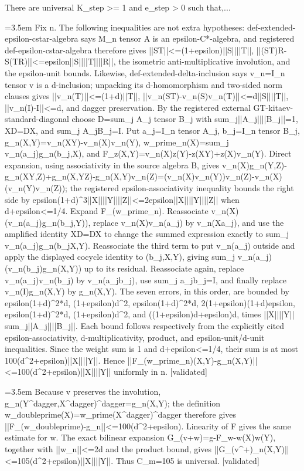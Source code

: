 \documentclass{article}
\newcommand{\step}[1]{\par\noindent\hangindent=3.5em\hangafter=1%
  \makebox[3.5em][l]{\textbf{#1.}}}
\newcommand{\steptag}[1]{\hfill{\small\textsf{[#1]}}}
\begin{document}
\begin{proofbox}{There are universal K\_step >= 1 and e\_step > 0 such that,...}
\step{1.3.1} Fix n. The following inequalities are not extra hypotheses: def-extended-epsilon-cstar-algebra says M\_n tensor A is an epsilon-C*-algebra, and registered def-epsilon-cstar-algebra therefore gives ||ST||<=(1+epsilon)||S||||T||, ||(ST)R-S(TR)||<=epsilon||S||||T||||R||, the isometric anti-multiplicative involution, and the epsilon-unit bounds. Likewise, def-extended-delta-inclusion says v\_n=I\_n tensor v is a d-inclusion; unpacking its d-homomorphism and two-sided norm clauses gives ||v\_n(T)||<=(1+d)||T||, ||v\_n(ST)-v\_n(S)v\_n(T)||<=d||S||||T||, ||v\_n(I)-I||<=d, and dagger preservation. By the registered external GT-kitaev-standard-diagonal choose D=sum\_j A\_j tensor B\_j with sum\_j||A\_j||||B\_j||=1, XD=DX, and sum\_j A\_jB\_j=I. Put a\_j=I\_n tensor A\_j, b\_j=I\_n tensor B\_j, g\_n(X,Y)=v\_n(XY)-v\_n(X)v\_n(Y), w\_prime\_n(X)=sum\_j v\_n(a\_j)g\_n(b\_j,X), and F\_z(X,Y)=v\_n(X)z(Y)-z(XY)+z(X)v\_n(Y). Direct expansion, using associativity in the source algebra B, gives v\_n(X)g\_n(Y,Z)-g\_n(XY,Z)+g\_n(X,YZ)-g\_n(X,Y)v\_n(Z)=(v\_n(X)v\_n(Y))v\_n(Z)-v\_n(X)(v\_n(Y)v\_n(Z)); the registered epsilon-associativity inequality bounds the right side by epsilon(1+d)\textasciicircum{}3||X||||Y||||Z||<=2epsilon||X||||Y||||Z|| when d+epsilon<=1/4. Expand F\_(w\_prime\_n). Reassociate v\_n(X)(v\_n(a\_j)g\_n(b\_j,Y)), replace v\_n(X)v\_n(a\_j) by v\_n(Xa\_j), and use the amplified identity XD=DX to change the summed expression exactly to sum\_j v\_n(a\_j)g\_n(b\_jX,Y). Reassociate the third term to put v\_n(a\_j) outside and apply the displayed cocycle identity to (b\_j,X,Y), giving sum\_j v\_n(a\_j)(v\_n(b\_j)g\_n(X,Y)) up to its residual. Reassociate again, replace v\_n(a\_j)v\_n(b\_j) by v\_n(a\_jb\_j), use sum\_j a\_jb\_j=I, and finally replace v\_n(I)g\_n(X,Y) by g\_n(X,Y). The seven errors, in this order, are bounded by epsilon(1+d)\textasciicircum{}2*d, (1+epsilon)d\textasciicircum{}2, epsilon(1+d)\textasciicircum{}2*d, 2(1+epsilon)(1+d)epsilon, epsilon(1+d)\textasciicircum{}2*d, (1+epsilon)d\textasciicircum{}2, and ((1+epsilon)d+epsilon)d, times ||X||||Y|| sum\_j||A\_j||||B\_j||. Each bound follows respectively from the explicitly cited epsilon-associativity, d-multiplicativity, product, and epsilon-unit/d-unit inequalities. Since the weight sum is 1 and d+epsilon<=1/4, their sum is at most 100(d\textasciicircum{}2+epsilon)||X||||Y||. Hence ||F\_(w\_prime\_n)(X,Y)-g\_n(X,Y)||<=100(d\textasciicircum{}2+epsilon)||X||||Y|| uniformly in n. \steptag{validated} \\[4pt]
\step{1.3.2} Because v preserves the involution, g\_n(Y\textasciicircum{}dagger,X\textasciicircum{}dagger)\textasciicircum{}dagger=g\_n(X,Y); the definition w\_doubleprime(X)=w\_prime(X\textasciicircum{}dagger)\textasciicircum{}dagger therefore gives ||F\_(w\_doubleprime)-g\_n||<=100(d\textasciicircum{}2+epsilon). Linearity of F gives the same estimate for w. The exact bilinear expansion G\_(v+w)=g-F\_w-w(X)w(Y), together with ||w\_n||<=2d and the product bound, gives ||G\_(v\textasciicircum{}+)\_n(X,Y)||<=105(d\textasciicircum{}2+epsilon)||X||||Y||. Thus C\_m=105 is universal. \steptag{validated} \\[4pt]

\end{proofbox}
\end{document}
